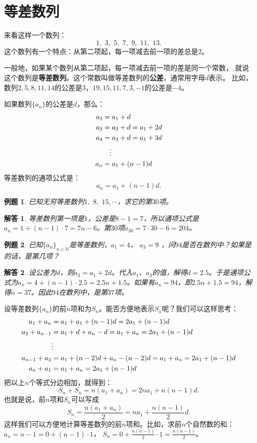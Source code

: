 \documentclass[12pt,UTF8]{ctexbook}
\newtheorem{et}{例题}[section]
\newtheorem*{so}{解答}
\begin{document}
\section{等差数列}
来看这样一个数列：
$$ 1,\,\,3,\,\,5,\,\,7,\,\,9,\,\,11,\,\, 13. $$
这个数列有一个特点：从第二项起，每一项减去前一项的差总是$2$。

一般地，如果某个数列从第二项起，每一项减去前一项的差是同一个常数，
就说这个数列是\textbf{等差数列}。这个常数叫做等差数列的\textbf{公差}，通常用字母$d$表示。
比如，数列$2,5,8,11,14$的公差是$3$，$19,15,11,7,3,-1$的公差是$-4$。

如果数列$\{a_n\}$的公差是$d$，那么：
\begin{align}
a_2 &= a_1 + d \notag \\
a_3 &= a_2 + d = a_1 + 2d \notag \\
a_4 &= a_3 + d = a_1 + 3d \notag \\
&\quad \vdots \notag \\
a_n &= a_1 + (n-1)d \notag 
\end{align}
等差数列的通项公式是：
$$a_n = a_1 + (n-1)d.$$
\begin{et}
已知无穷等差数列$1,\,\,8,\,\,15, \cdots$，求它的第$30$项。
\end{et}
\begin{so}
等差数列第一项是$1$，公差是$8-1=7$，所以通项公式是$a_n = 1 + (n-1)\cdot 7 = 7n - 6$。第$30$项$a_{30} = 7\cdot 30 - 6 = 204$。
\end{so}
\begin{et}
已知$\{a_n\}_{n\in\mathbb{N}}$是等差数列，$a_1 = 4$， $a_3 = 9$ ，问$94$是否在数列中？如果是的话，是第几项？
\end{et}
\begin{so}
设公差为$d$，则$a_3 = a_1 + 2d$。代入$a_1$、$a_3$的值，解得$d = 2.5$。于是通项公式为$a_n = 4 + (n-1)\cdot 2.5 = 2.5n + 1.5$。如果有$a_n = 94$，即$2.5n + 1.5=94$，解得$n = 37$。因此$94$在数列中，是第$37$项。
\end{so}

设等差数列$\{a_n\}$的前$n$项和为$S_n$。能否方便地表示$S_n$呢？我们可以这样思考：
\begin{align}
a_{1} + a_{n} &= a_1 + a_1 + (n-1)d = 2a_1 + (n-1)d \notag \\
a_{2} + a_{n-1} &= a_1 + d + a_n - d = a_1 + a_n = 2a_1 + (n-1)d \notag \\
&\vdots \notag \\
a_{n-1} + a_{2} &= a_1 + (n-2)d + a_n - (n-2)d = a_1 + a_n =  2a_1 + (n-1)d \notag \\
a_{n} + a_{1} &= a_1 + a_n = 2a_1 + (n-1)d \notag 
\end{align}
把以上$n$个等式分边相加，就得到：
$$ S_n + S_n = n(a_1 + a_n) = 2na_1 + n(n-1)d. $$
也就是说，前$n$项和$S_n$可以写成
$$ S_n = \frac{n(a_1 + a_n)}{2} = na_1 + \frac{n(n-1)}{2}d. $$
这样我们可以方便地计算等差数列的前$n$项和。比如，求前$n$个自然数的和：$a_n = n-1 = 0 + (n-1)\cdot 1$，
$S_n = 0 + \frac{n(n-1)}{2}\cdot 1 = \frac{n(n-1)}{2}$。
\end{document}
